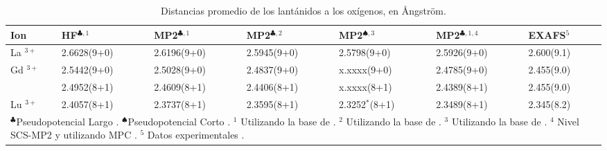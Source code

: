 \begin{table}[h!]
\centering  %
\caption{\footnotesize Distancias promedio de los lant\'anidos a los 
ox\'igenos, en {\AA}ngstr\"om.}
\begin{tabular}{p{1cm}|p{1.8cm}p{1.8cm}p{1.8cm}p{1.8cm}p{1.8cm}p{1.8cm}}\hline\hline
Ion & HF$^{\clubsuit,1}$ & MP2$^{\clubsuit,1}$ & MP2$^{\clubsuit,2}$ & MP2$^{\spadesuit,3}$ & MP2$^{\clubsuit,1,4}$ & EXAFS$^5$ \\ \hline
La $^{3+}$ & 2.6628(9+0) & 2.6196(9+0) & 2.5945(9+0) & 2.5798(9+0) 
& 2.5926(9+0) & 2.600(9.1) \\ 
Gd $^{3+}$ & 2.5442(9+0) & 2.5028(9+0) & 2.4837(9+0) & x.xxxx(9+0)  
& 2.4785(9+0) & 2.455(9.0) \\ 
           & 2.4952(8+1) & 2.4609(8+1) & 2.4406(8+1) & x.xxxx(8+1) 
& 2.4389(8+1) & 2.455(9.0)  \\ 
Lu $^{3+}$ & 2.4057(8+1) & 2.3737(8+1) & 2.3595(8+1) & 2.3252$^*$(8+1) 
& 2.3489(8+1) & 2.345(8.2) \\ 
\hline 
\multicolumn{7}{p{14cm}}{\footnotesize{
$^{\clubsuit }$Pseudopotencial Largo \citep{Dolg1989}.}%
$^{\spadesuit}$Pseudopotencial Corto \citep{Cao2001}. %
{\footnotesize $^1$ Utilizando la base de \cite{Dolg1993}.}%
{\footnotesize $^2$ Utilizando la base de \cite{Yang2005}.}%
{\footnotesize $^3$ Utilizando la base de \cite{Cao2002}.} %
{\footnotesize $^4$ Nivel SCS-MP2 \citep{Grim2003} y utilizando MPC 
\citep{Toma2005}. $^5$ Datos experimentales \citep{Dang2012}.}}%
\end{tabular}\label{tDis}\end{table}
